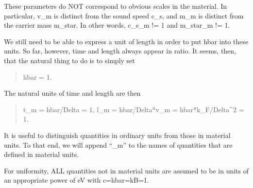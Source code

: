\documentclass[letterpaper,10pt,english]{sphinxmanual}
\begin{document}
These parameters do NOT correspond to obvious scales in the material. In
particular, v\_m is distinct from the sound speed c\_s, and m\_m is distinct from
the carrier mass m\_star. In other words, c\_s\_m != 1 and m\_star\_m != 1.

We still need to be able to express a unit of length in order to put hbar into
these units. So far, however, time and length always appear in ratio. It
seems, then, that the natural thing to do is to simply set
\begin{quote}

hbar = 1.
\end{quote}

The natural units of time and length are then
\begin{quote}

t\_m = hbar/Delta = 1,
l\_m = hbar/Delta*v\_m = hbar*k\_F/Delta\textasciicircum{}2 = 1.
\end{quote}

It is useful to distinguish quantities in ordinary units from those in
material units. To that end, we will append “\_m” to the names of quantities
that are defined in material units.

For uniformity, ALL quantities not in material units are assumed to be in
units of an appropriate power of eV with c=hbar=kB=1.
\end{document}
